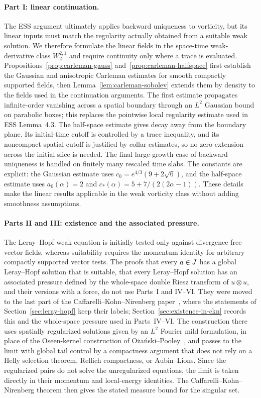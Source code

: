 \documentclass[11pt,letterpaper]{article}
\numberwithin{equation}{section}
\theoremstyle{plain}
\theoremstyle{definition}
\theoremstyle{remark}
\begin{document}
\paragraph{Part I: linear continuation.}
The ESS argument ultimately applies backward uniqueness to vorticity, but its linear inputs must match the regularity actually obtained from a suitable weak solution. We therefore formulate the linear fields in the space-time weak-derivative class $W^{2,1}_2$ and require continuity only where a trace is evaluated. Propositions~\ref{prop:carleman-gauss} and~\ref{prop:carleman-halfspace} first establish the Gaussian and anisotropic Carleman estimates for smooth compactly supported fields, then Lemma~\ref{lem:carleman-sobolev} extends them by density to the fields used in the continuation arguments. The first estimate propagates infinite-order vanishing across a spatial boundary through an $L^2$ Gaussian bound on parabolic boxes; this replaces the pointwise local regularity estimate used in ESS Lemma~4.3. The half-space estimate gives decay away from the boundary plane. Its initial-time cutoff is controlled by a trace inequality, and its noncompact spatial cutoff is justified by collar estimates, so no zero extension across the initial slice is needed. The final large-growth case of backward uniqueness is handled on finitely many rescaled time slabs. The constants are explicit: the Gaussian estimate uses $c_0=e^{4/3}(9+2\sqrt6)$, and the half-space estimate uses $a_0(\alpha)=2$ and $c_*(\alpha)=5+7/(2(2\alpha-1))$. These details make the linear results applicable in the weak vorticity class without adding smoothness assumptions.

\paragraph{Parts II and III: existence and the associated pressure.}
The Leray--Hopf weak equation is initially tested only against divergence-free vector fields, whereas suitability requires the momentum identity for arbitrary compactly supported vector tests. The proofs that every $a\in J$ has a global Leray--Hopf solution that is suitable, that every Leray--Hopf solution has an associated pressure defined by the whole-space double Riesz transform of $u\otimes u$, and their versions with a force, do not use Parts~I and IV--VI. They were moved to the last part of the Caffarelli--Kohn--Nirenberg paper~\cite{CKNLean}, where the statements of Section~\ref{sec:leray-hopf} keep their labels; Section~\ref{sec:existence-in-ckn} records this and the whole-space pressure used in Parts~IV--VI. The construction there uses spatially regularized solutions given by an $L^2$ Fourier mild formulation, in place of the Oseen-kernel construction of O{\.z}a{\'n}ski--Pooley~\cite[Theorem~4.2]{OzanskiPooley2018}, and passes to the limit with global tail control by a compactness argument that does not rely on a Helly selection theorem, Rellich compactness, or Aubin--Lions. Since the regularized pairs do not solve the unregularized equations, the limit is taken directly in their momentum and local-energy identities. The Caffarelli--Kohn--Nirenberg theorem then gives the stated measure bound for the singular set.
\end{document}
